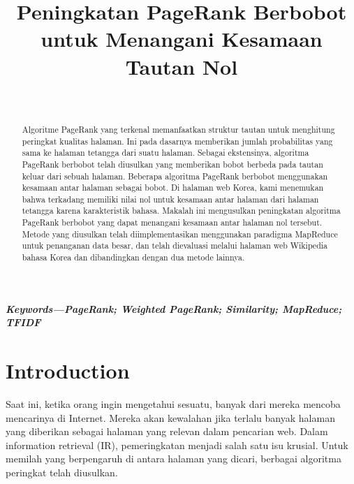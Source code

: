 \documentclass[conference]{IEEEtran}
\title{\textbf{Peningkatan PageRank Berbobot untuk Menangani Kesamaan Tautan Nol}}
\author{\IEEEauthorblockN{Budi Prasetio}\\
\IEEEauthorblockA{Fakultas Teknologi Informasi\\
Institut Teknologi Batam\\
Batam, Kepulauan Riau, Indonesia\\
2022015@student.iteba.ac.id}}
\begin{document}
\maketitle

\begin{abstract}
    Algoritme PageRank yang terkenal memanfaatkan struktur tautan untuk menghitung peringkat kualitas halaman. Ini pada dasarnya memberikan jumlah probabilitas yang sama ke halaman tetangga dari suatu halaman. Sebagai ekstensinya, algoritma PageRank berbobot telah diusulkan yang memberikan bobot berbeda pada tautan keluar dari sebuah halaman. Beberapa algoritma PageRank berbobot menggunakan kesamaan antar halaman sebagai bobot. Di halaman web Korea, kami menemukan bahwa terkadang memiliki nilai nol untuk kesamaan antar halaman dari halaman tetangga karena karakteristik bahasa. Makalah ini mengusulkan peningkatan algoritma PageRank berbobot yang dapat menangani kesamaan antar halaman nol tersebut. Metode yang diusulkan telah diimplementasikan menggunakan paradigma MapReduce untuk penanganan data besar, dan telah dievaluasi melalui halaman web Wikipedia bahasa Korea dan dibandingkan dengan dua metode lainnya.

\end{abstract}\hspace{10pt}

\textbf{\textit{Keywords---PageRank; Weighted PageRank; Similarity; MapReduce; TFIDF}}
\section{Introduction}
Saat ini, ketika orang ingin mengetahui sesuatu, banyak dari mereka mencoba mencarinya di Internet. Mereka akan kewalahan jika terlalu banyak halaman yang diberikan sebagai halaman yang relevan dalam pencarian web. Dalam information retrieval (IR), pemeringkatan menjadi salah satu isu krusial. Untuk memilah yang berpengaruh di antara halaman yang dicari, berbagai algoritma peringkat telah diusulkan. \cite{brin1998anatomy,xing2004weighted,qiao2010simrank,page1999pagerank,kumar2013pagerank,duhan2009page,najork2007comparing,kumar2011page,nemirovsky2008weighted,tyagi2012weighted,haveliwala2003topic}
\end{document}

